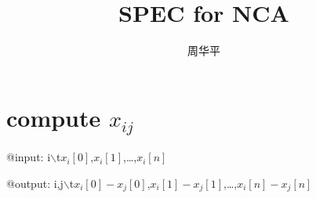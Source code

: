 \documentclass[a4paper,UTF8]{article}
\theoremstyle{definition}
\begin{document}
\title{SPEC for NCA}
\author{周华平}
\maketitle 

\section*{compute $x_{ij}$}
@input: i$\backslash$t$x_i[0]$,$x_i[1]$,\ldots,$x_i[n]$

@output: i,j$\backslash$t$x_i[0]-x_j[0]$,$x_i[1]-x_j[1]$,\ldots,$x_i[n]-x_j[n]$
\end{document}
